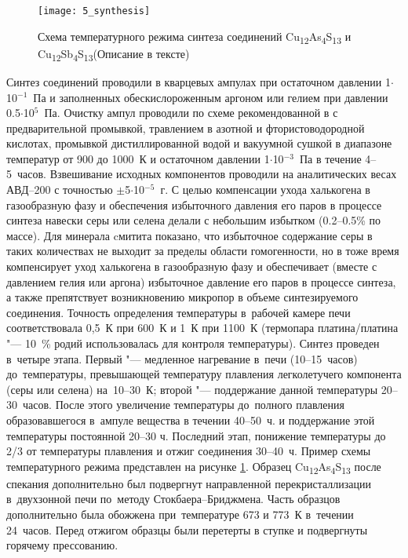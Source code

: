 \begin{figure}[pt!]
  \begin{minipage}[ht]{0.99\linewidth}\centering
    \texttt{[image: 5\_synthesis]}
  \end{minipage}
       \caption[Схема температурного режима синтеза соединений Cu\textsubscript{12}As\textsubscript{4}S\textsubscript{13} и Cu\textsubscript{12}Sb\textsubscript{4}S\textsubscript{13}]{Схема температурного режима синтеза соединений Cu\textsubscript{12}As\textsubscript{4}S\textsubscript{13} и Cu\textsubscript{12}Sb\textsubscript{4}S\textsubscript{13}(Описание в тексте)}
    \label{img:figure3}
\end{figure}

Синтез соединений проводили в кварцевых ампулах при остаточном давлении 1$\cdot$10$^{-1}$~Па и заполненных обескислороженным аргоном или гелием при давлении 0.5$\cdot$10$^{5}$~Па. Очистку ампул проводили по схеме рекомендованной в \cite{156} с предварительной промывкой, травлением в азотной и фтористоводородной кислотах, промывкой дистиллированной водой и вакуумной сушкой в диапазоне температур от 900 до 1000~К и остаточном давлении 1$\cdot$10$^{-3}$~Па в течение 4--5~часов. Взвешивание исходных компонентов проводили на аналитических весах АВД--200 с точностью $\pm$5$\cdot$10$^{-5}$~г.
С целью компенсации ухода халькогена в газообразную фазу и обеспечения избыточного давления его паров в процессе синтеза навески серы или селена делали с небольшим избытком (0.2--0.5\% по массе).
Для минерала cмитита показано\cite{181}, что избыточное содержание серы в таких количествах не выходит за пределы области гомогенности, но в тоже время компенсирует уход халькогена в газообразную фазу и обеспечивает (вместе с давлением гелия или аргона) избыточное давление его паров в процессе синтеза, а также препятствует возникновению микропор в объеме синтезируемого соединения.
Точность определения температуры в~рабочей камере печи соответствовала 0,5~К при 600~К и 1~К при 1100~К (термопара платина/платина "--- 10~\% родий использовалась для контроля температуры). Синтез проведен в~четыре этапа. Первый "--- медленное нагревание в~печи (10--15~часов) до~температуры, превышающей температуру плавления легколетучего компонента (серы или селена) на~10--30~К; второй "--- поддержание данной температуры 20--30~часов. После этого увеличение температуры до~полного плавления образовавшегося в~ампуле вещества в течении 40--50~ч. и поддержание этой температуры постоянной 20--30 ч. Последний этап, понижение температуры до 2/3 от температуры плавления и отжиг соединения 30--40~ч.
 Пример схемы температурного режима представлен на рисунке \ref{img:figure3}. Образец Cu\textsubscript{12}As\textsubscript{4}S\textsubscript{13} после спекания дополнительно был подвергнут направленной перекристаллизации в~двухзонной печи по~методу Стокбаера--Бриджмена. Часть образцов дополнительно была обожжена при~температуре 673 и 773~К в~течении 24~часов.
Перед отжигом образцы были перетерты в ступке и подвергнуты горячему прессованию.

